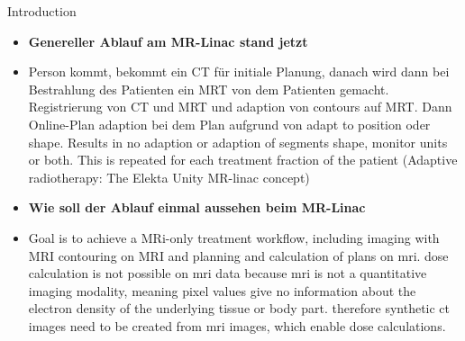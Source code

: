 Introduction
\begin{itemize}
    \item \textbf{Genereller Ablauf am MR-Linac stand jetzt}
    \item Person kommt, bekommt ein CT für initiale Planung, danach wird dann bei Bestrahlung des Patienten ein MRT von dem Patienten gemacht. Registrierung von CT und MRT und adaption von contours auf MRT. Dann Online-Plan adaption bei dem Plan aufgrund von adapt to position oder shape. Results in no adaption or adaption of segments shape, monitor units or both. This is repeated for each treatment fraction of the patient (Adaptive radiotherapy: The Elekta Unity MR-linac concept)

    \item \textbf{Wie soll der Ablauf einmal aussehen beim MR-Linac}
    \item Goal is to achieve a MRi-only treatment workflow, including imaging with MRI contouring on MRI and planning and calculation of plans on mri. dose calculation is not possible on mri data because mri is not a quantitative imaging modality, meaning pixel values give no information about the electron density of the underlying tissue or body part. therefore synthetic ct images need to be created from mri images, which enable dose calculations. 
    

\end{itemize}
